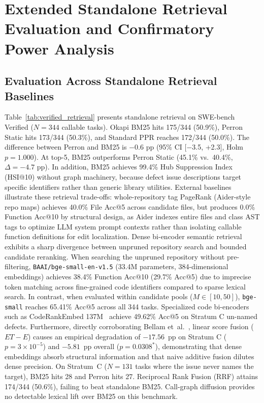 \documentclass[10pt]{article}
\begin{document}
\section{Extended Standalone Retrieval Evaluation and Confirmatory Power Analysis}
\label{app:standalone_retrieval}

\subsection{Evaluation Across Standalone Retrieval Baselines}
Table~\ref{tab:verified_retrieval} presents standalone retrieval on SWE-bench Verified ($N=344$ callable tasks). Okapi BM25 hits 175/344 (50.9\%), Perron Static hits 173/344 (50.3\%), and Standard PPR reaches 172/344 (50.0\%). The difference between Perron and BM25 is $-0.6$ pp (95\% CI [$-$3.5, +2.3], Holm $p=1.000$). At top-5, BM25 outperforms Perron Static (45.1\% vs.\ 40.4\%, $\Delta = -4.7$ pp). In addition, BM25 achieves 99.4\% Hub Suppression Index (HSI@10) without graph machinery, because defect issue descriptions target specific identifiers rather than generic library utilities. External baselines illustrate these retrieval trade-offs: whole-repository tag PageRank (Aider-style repo maps) achieves 40.0\% File Acc@5 across candidate files, but produces 0.0\% Function Acc@10 by structural design, as Aider indexes entire files and class AST tags to optimize LLM system prompt contexts rather than isolating callable function definitions for edit localization. Dense bi-encoder semantic retrieval exhibits a sharp divergence between unpruned repository search and bounded candidate reranking. When searching the unpruned repository without pre-filtering, \texttt{BAAI/bge-small-en-v1.5} (33.4M parameters, 384-dimensional embeddings) achieves 38.4\% Function Acc@10 (29.7\% Acc@5) due to imprecise token matching across fine-grained code identifiers compared to sparse lexical search. In contrast, when evaluated within candidate pools ($M \in [10, 50]$), \texttt{bge-small} reaches 65.41\% Acc@5 across all 344 tasks. Specialized code bi-encoders such as CodeRankEmbed 137M~\cite{suresh2024coderankembed} achieve 49.62\% Acc@5 on Stratum C un-named defects. Furthermore, directly corroborating Bellam et~al.~\cite{bellam2025limits}, linear score fusion ($ET-E$) causes an empirical degradation of $-17.56$~pp on Stratum C ($p = 3 \times 10^{-5}$) and $-5.81$~pp overall ($p=0.0308^*$), demonstrating that dense embeddings absorb structural information and that naive additive fusion dilutes dense precision. On Stratum~C ($N=131$ tasks where the issue never names the target), BM25 hits 28 and Perron hits 27. Reciprocal Rank Fusion (RRF) attains 174/344 (50.6\%), failing to beat standalone BM25. Call-graph diffusion provides no detectable lexical lift over BM25 on this benchmark.
\end{document}
